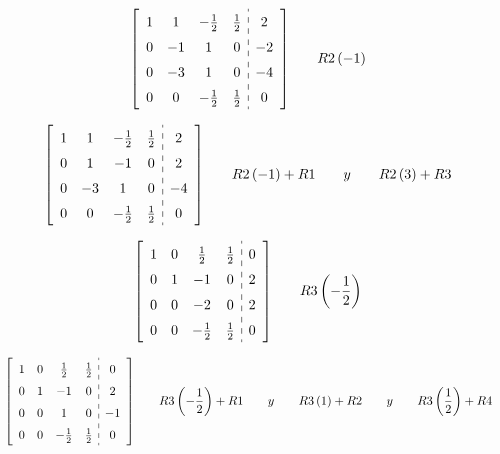 \documentclass[fleqn]{article}
\begin{document}
    \begin{alignat*}{2}
      &\left[\def\arraystretch{1.5}
        \begin{array}{cccc:c}
          1 & 1 & -\frac{1}{2} & \frac{1}{2} & 2 \\
          0 & -1 & 1 & 0 & -2 \\
          0 & -3 & 1 & 0 & -4 \\
          0 & 0 & -\frac{1}{2} & \frac{1}{2} & 0 
        \end{array}
      \right]
      \quad
      && R2\left(-1\right)
    \end{alignat*}
  
    \begin{alignat*}{2}
      &\left[\def\arraystretch{1.5}
        \begin{array}{cccc:c}
          1 & 1 & -\frac{1}{2} & \frac{1}{2} & 2 \\
          0 & 1 & -1 & 0 & 2 \\
          0 & -3 & 1 & 0 & -4 \\
          0 & 0 & -\frac{1}{2} & \frac{1}{2} & 0
        \end{array}
      \right]
      \quad
      && R2\left(-1\right)+R1 \qquad y \qquad R2\left(3\right)+R3
    \end{alignat*}

    \begin{alignat*}{2}
      &\left[\def\arraystretch{1.5}
        \begin{array}{cccc:c}
          1 & 0 & \frac{1}{2} & \frac{1}{2} & 0 \\
          0 & 1 & -1 & 0 & 2 \\
          0 & 0 & -2 & 0 & 2 \\
          0 & 0 & -\frac{1}{2} & \frac{1}{2} & 0
        \end{array}
      \right]
      \quad
      && R3\left(-\frac{1}{2}\right)
    \end{alignat*}

    \begin{alignat*}{2}
      &\left[\def\arraystretch{1.5}
        \begin{array}{cccc:c}
          1 & 0 & \frac{1}{2} & \frac{1}{2} & 0 \\
          0 & 1 & -1 & 0 & 2 \\
          0 & 0 & 1 & 0 & -1 \\
          0 & 0 & -\frac{1}{2} & \frac{1}{2} & 0 
        \end{array}
      \right]
      \quad
      && R3\left(-\frac{1}{2}\right)+R1 \qquad y \qquad R3\left(1\right)+R2 \qquad y \qquad R3\left(\frac{1}{2}\right)+R4
    \end{alignat*}
\end{document}
